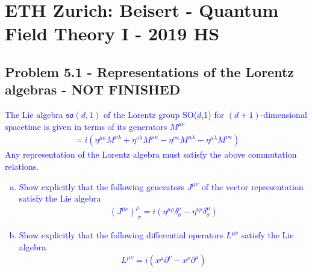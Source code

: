 \documentclass[../main.tex]{subfiles}
\begin{document}
\section{ETH Zurich: {\sc Beisert} - Quantum Field Theory I - 2019 HS}

\subsection{Problem 5.1 - Representations of the Lorentz algebras - NOT FINISHED}
\textcolor{blue}{
The Lie algebra $\mathfrak{so}(d,1)$ of the Lorentz group SO($d$,1) for $(d+1)$-dimensional spacetime is given in terms of its generators $M^{\mu\nu}$
\begin{align}
[M^{\mu\nu},M^{\lambda\kappa}]=i(
\eta^{\mu\kappa}M^{\nu\lambda}+
\eta^{\nu\lambda}M^{\mu\kappa}-
\eta^{\nu\kappa}M^{\mu\lambda}-
\eta^{\mu\lambda}M^{\nu\kappa}
)
\end{align}
Any representation of the Lorentz algebra must satisfy the above commutation relations.
\begin{enumerate}[a)]
\item Show explicitly that the following generators $J^{\mu\nu}$ of the vector representation satisfy the Lie algebra
\begin{align}
(J^{\mu\nu})^\rho_{\;\sigma}=i(\eta^{\mu\rho}\delta^\nu_\sigma-\eta^{\nu\rho}\delta^\mu_\sigma)
\end{align}
\item Show explicitly that the following diﬀerential operators $L^{\mu\nu}$ satisfy the Lie algebra
\begin{align}
L^{\mu\nu}=i(x^\mu\partial^\nu-x^\nu\partial^\mu)
\end{align}
\end{enumerate}
}
\end{document}
